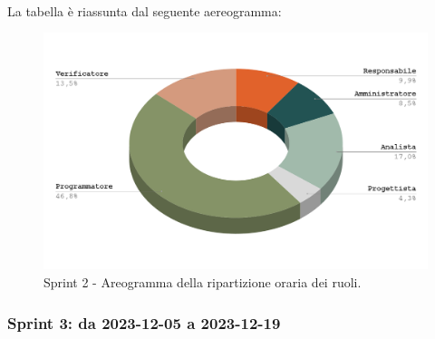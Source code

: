 \documentclass[10pt, a4paper]{article}
\begin{document}
{{{{{{{{{{\paragraph{}La tabella è riassunta dal seguente aereogramma:
 \begin{figure}[H]
        \centering        
        \includegraphics[width=15.5cm]{aereogrammi/areogramma_2_periodo.png}
        \caption{Sprint 2 - Areogramma della ripartizione oraria dei ruoli. }
    \end{figure}





\subsubsection{Sprint 3: da 2023-12-05 a 2023-12-19}
}}}}}}}}}}
\end{document}
